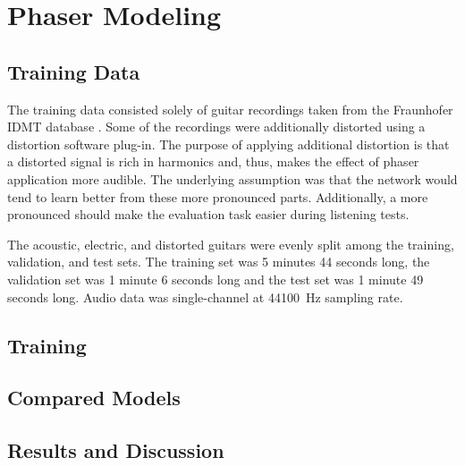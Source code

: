 \section{Phaser Modeling}

\subsection{Training Data}
\label{sec:phaser_training_data}

The training data consisted solely of guitar recordings taken from the Fraunhofer IDMT database \cite{Kehling2014}. Some of the recordings were additionally distorted using a distortion  software plug-in. The purpose of applying additional distortion is that a distorted signal is rich in harmonics and, thus, makes the effect of phaser application more audible. The underlying assumption was that the network would tend to learn better from these more pronounced parts. Additionally, a more pronounced should make the evaluation task easier during listening tests. 

The acoustic, electric, and distorted guitars were evenly split among the training, validation, and test sets. The training set was 5 minutes 44 seconds long, the validation set was 1 minute 6 seconds long and the test set was 1 minute 49 seconds long. Audio data was single-channel at \SI{44100}{Hz} sampling rate.


\subsection{Training}
\label{sec:phaser_training}

\subsection{Compared Models}
\label{sec:phaser_models}


\subsection{Results and Discussion}
\label{sec:phaser_results}


